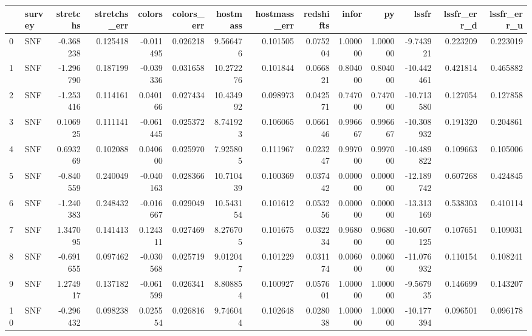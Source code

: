 \begin{tabular}{llrrrrrrrrrrrr}
\toprule
{} & survey &  stretchs &  stretchs\_err &    colors &  colors\_err &   hostmass &  hostmass\_err &  redshifts &     infor &        py &      lssfr &  lssfr\_err\_d &  lssfr\_err\_u \\
\midrule
0   &    SNF & -0.368238 &      0.125418 & -0.011495 &    0.026218 &   9.566476 &      0.101505 &   0.075204 &  1.000000 &  1.000000 &  -9.743921 &     0.223209 &     0.223019 \\
1   &    SNF & -1.296790 &      0.187199 & -0.039336 &    0.031658 &  10.272276 &      0.101844 &   0.066821 &  0.804000 &  0.804000 & -10.442461 &     0.421814 &     0.465882 \\
2   &    SNF & -1.253416 &      0.114161 &  0.040166 &    0.027434 &  10.434992 &      0.098973 &   0.042571 &  0.747000 &  0.747000 & -10.713580 &     0.127054 &     0.127858 \\
3   &    SNF &  0.106925 &      0.111141 & -0.061445 &    0.025372 &   8.741923 &      0.106065 &   0.066146 &  0.996667 &  0.996667 & -10.308932 &     0.191320 &     0.204861 \\
4   &    SNF &  0.693269 &      0.102088 &  0.040600 &    0.025970 &   7.925805 &      0.111967 &   0.023247 &  0.997000 &  0.997000 & -10.489822 &     0.109663 &     0.105006 \\
5   &    SNF & -0.840559 &      0.240049 & -0.040163 &    0.028366 &  10.710439 &      0.100369 &   0.037442 &  0.000000 &  0.000000 & -12.189742 &     0.607268 &     0.424845 \\
6   &    SNF & -1.240383 &      0.248432 & -0.016667 &    0.029049 &  10.543154 &      0.101612 &   0.053256 &  0.000000 &  0.000000 & -13.313169 &     0.538303 &     0.410114 \\
7   &    SNF &  1.347095 &      0.141413 &  0.124311 &    0.027469 &   8.276705 &      0.101675 &   0.032234 &  0.968000 &  0.968000 & -10.607125 &     0.107651 &     0.109031 \\
8   &    SNF & -0.691655 &      0.097462 & -0.030568 &    0.025719 &   9.012047 &      0.101229 &   0.031174 &  0.006000 &  0.006000 & -11.076932 &     0.110154 &     0.108241 \\
9   &    SNF &  1.274917 &      0.137182 & -0.061599 &    0.026341 &   8.808854 &      0.100927 &   0.057601 &  1.000000 &  1.000000 &  -9.567935 &     0.146699 &     0.143207 \\
10  &    SNF & -0.296432 &      0.098238 &  0.025554 &    0.026816 &   9.746044 &      0.102648 &   0.028038 &  1.000000 &  1.000000 & -10.177394 &     0.096501 &     0.096178 \\

\end{tabular}
